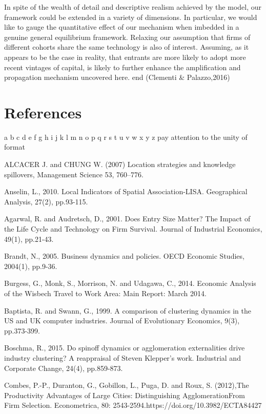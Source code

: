 \documentclass[
  12pt,
  oneside]{book}
\begin{document}
In spite of the wealth of detail and descriptive realism achieved by the model, our framework could be extended in a variety of dimensions. In particular, we would like to gauge the quantitative effect of our mechanism when imbedded in a genuine general equilibrium framework. Relaxing our assumption that firms of different cohorts share the same technology is also of interest. Assuming, as it appears to be the case in reality, that entrants are more likely to adopt more recent vintages of capital, is likely to further enhance the amplification and propagation mechanism uncovered here.
end (Clementi \& Palazzo,2016)

\hypertarget{references}{%
\chapter*{References}\label{references}}

a b c d e f g h i j k l m n o p q r s t u v w x y z
pay attention to the unity of format

ALCACER J. and CHUNG W. (2007) Location strategies and knowledge spillovers, Management Science 53, 760--776.

Anselin, L., 2010. Local Indicators of Spatial Association-LISA. Geographical Analysis, 27(2), pp.93-115.

Agarwal, R. and Audretsch, D., 2001. Does Entry Size Matter? The Impact of the Life Cycle and Technology on Firm Survival. Journal of Industrial Economics, 49(1), pp.21-43.

Brandt, N., 2005. Business dynamics and policies. OECD Economic Studies, 2004(1), pp.9-36.

Burgess, G., Monk, S., Morrison, N. and Udagawa, C., 2014. Economic Analysis of the Wisbech Travel to Work Area: Main Report: March 2014.

Baptista, R. and Swann, G., 1999. A comparison of clustering dynamics in the US and UK computer industries. Journal of Evolutionary Economics, 9(3), pp.373-399.

Boschma, R., 2015. Do spinoff dynamics or agglomeration externalities drive industry clustering? A reappraisal of Steven Klepper's work. Industrial and Corporate Change, 24(4), pp.859-873.

Combes, P.-P., Duranton, G., Gobillon, L., Puga, D. and Roux, S. (2012),The Productivity Advantages of Large Cities: Distinguishing AgglomerationFrom Firm Selection. Econometrica, 80: 2543-2594.https://doi.org/10.3982/ECTA84427
\end{document}
